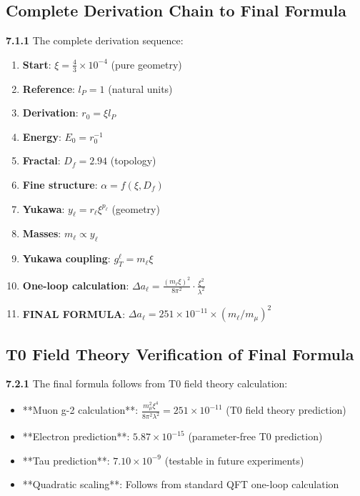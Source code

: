 \documentclass[12pt,a4paper]{article}
\newcommand{\lP}{l_P}
\newcommand{\rzero}{r_0}
\newcommand{\Ezero}{E_0}
\newcommand{\xipar}{\xi}
\begin{document}
	\subsection{Complete Derivation Chain to Final Formula}
	
	\noindent \textbf{7.1.1} The complete derivation sequence:
	\begin{enumerate}
		\item \textbf{Start}: $\xipar = \frac{4}{3} \times 10^{-4}$ (pure geometry)
		\item \textbf{Reference}: $\lP = 1$ (natural units)
		\item \textbf{Derivation}: $\rzero = \xipar \lP$
		\item \textbf{Energy}: $\Ezero = \rzero^{-1}$
		\item \textbf{Fractal}: $D_f = 2.94$ (topology)
		\item \textbf{Fine structure}: $\alpha = f(\xipar, D_f)$
		\item \textbf{Yukawa}: $y_\ell = r_\ell \xipar^{p_\ell}$ (geometry)
		\item \textbf{Masses}: $m_\ell \propto y_\ell$
		\item \textbf{Yukawa coupling}: $g_T^\ell = m_\ell \xi$
		\item \textbf{One-loop calculation}: $\Delta a_\ell = \frac{(m_\ell \xi)^2}{8\pi^2} \cdot \frac{\xi^2}{\lambda^2}$
		\item \textbf{FINAL FORMULA}: $\Delta a_\ell = 251 \times 10^{-11} \times (m_\ell/m_\mu)^2$
	\end{enumerate}
	
	\subsection{T0 Field Theory Verification of Final Formula}
	
	\noindent \textbf{7.2.1} The final formula follows from T0 field theory calculation:
	\begin{itemize}
		\item **Muon g-2 calculation**: $\frac{m_\mu^2 \xi^4}{8\pi^2 \lambda^2} = 251 \times 10^{-11}$ (T0 field theory prediction)
		\item **Electron prediction**: $5.87 \times 10^{-15}$ (parameter-free T0 prediction)
		\item **Tau prediction**: $7.10 \times 10^{-9}$ (testable in future experiments)
		\item **Quadratic scaling**: Follows from standard QFT one-loop calculation
	\end{itemize}
	
\end{document}
